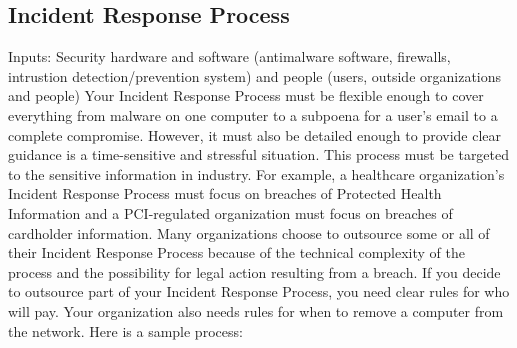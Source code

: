 \subsection{Incident Response Process}
Inputs: Security hardware and software (antimalware software, firewalls, intrustion detection/prevention system) and people (users, outside organizations and people)
Your Incident Response Process must be flexible enough to cover everything from malware on one computer to a subpoena for a user's email to a complete compromise. However, it must also be detailed enough to provide clear guidance is a time-sensitive and stressful situation. This process must be targeted to the sensitive information in industry. For example, a healthcare organization's Incident Response Process must focus on breaches of Protected Health Information and a PCI-regulated organization must focus on breaches of cardholder information. Many organizations choose to outsource  some or all of their Incident Response Process because of the technical complexity of the process and the possibility for legal action resulting from a breach. If you decide to outsource part of your Incident Response Process, you need clear rules for who will pay. Your organization also needs rules for when to remove a computer from the network. Here is a sample process:
